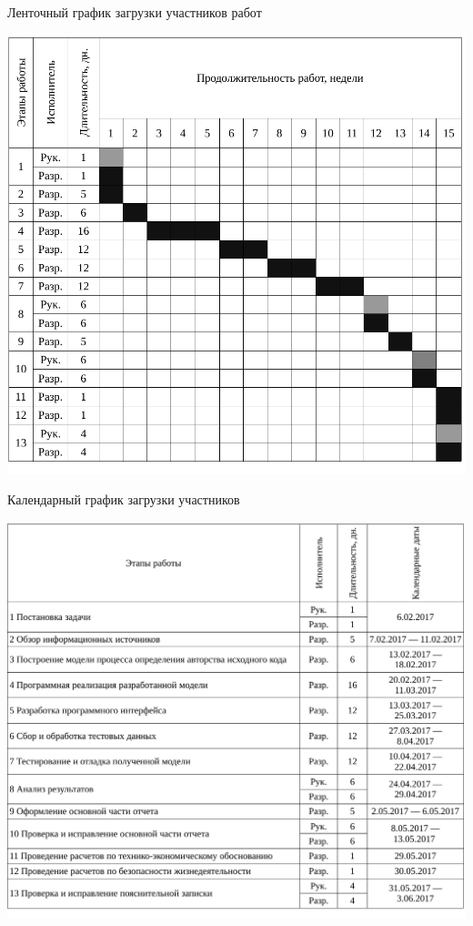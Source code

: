 \begin{table}[!ht]
\caption{Ленточный график загрузки участников работ}
\centering
\includegraphics[page=1, width=1\linewidth]{tables/economics/schedule_2.pdf}
\label{tab:job_is_done_2}
\end{table}

\begin{table}[!ht]
\caption{Календарный график загрузки участников}
\centering
\includegraphics[page=1, width=1\linewidth]{tables/economics/schedule_3.pdf}
\label{tab:job_is_done_3}
\end{table}


